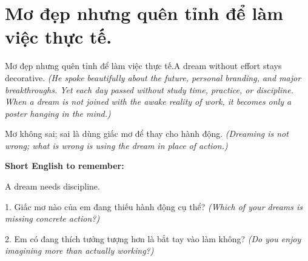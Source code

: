 \section{Mơ đẹp nhưng quên tỉnh để làm việc thực tế.}
\begin{truyen}{Mơ đẹp nhưng quên tỉnh để làm việc thực tế.}{A dream without effort stays decorative.}
\textit{(He spoke beautifully about the future, personal branding, and major breakthroughs. Yet each day passed without study time, practice, or discipline. When a dream is not joined with the awake reality of work, it becomes only a poster hanging in the mind.)}
\end{truyen}
\begin{baihoc}
Mơ không sai; sai là dùng giấc mơ để thay cho hành động.
\textit{(Dreaming is not wrong; what is wrong is using the dream in place of action.)}
\end{baihoc}
\begin{ghinhoanh}
\textbf{Short English to remember:}

A dream needs discipline.
\end{ghinhoanh}
\begin{tuhocnhanh}
1. Giấc mơ nào của em đang thiếu hành động cụ thể? \textit{(Which of your dreams is missing concrete action?)}

2. Em có đang thích tưởng tượng hơn là bắt tay vào làm không? \textit{(Do you enjoy imagining more than actually working?)}
\end{tuhocnhanh}
\ngancach

